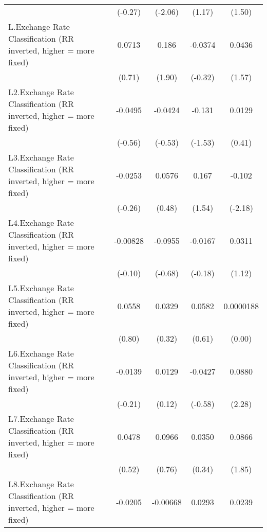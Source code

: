{\begin{longtable}{l*{4}{c}}
                &  (-0.27)         &  (-2.06)         &   (1.17)         &   (1.50)         \\
[1em]
L.Exchange Rate Classification (RR inverted, higher = more fixed)&   0.0713         &    0.186         &  -0.0374         &   0.0436         \\
                &   (0.71)         &   (1.90)         &  (-0.32)         &   (1.57)         \\
[1em]
L2.Exchange Rate Classification (RR inverted, higher = more fixed)&  -0.0495         &  -0.0424         &   -0.131         &   0.0129         \\
                &  (-0.56)         &  (-0.53)         &  (-1.53)         &   (0.41)         \\
[1em]
L3.Exchange Rate Classification (RR inverted, higher = more fixed)&  -0.0253         &   0.0576         &    0.167         &   -0.102\sym{*}  \\
                &  (-0.26)         &   (0.48)         &   (1.54)         &  (-2.18)         \\
[1em]
L4.Exchange Rate Classification (RR inverted, higher = more fixed)& -0.00828         &  -0.0955         &  -0.0167         &   0.0311         \\
                &  (-0.10)         &  (-0.68)         &  (-0.18)         &   (1.12)         \\
[1em]
L5.Exchange Rate Classification (RR inverted, higher = more fixed)&   0.0558         &   0.0329         &   0.0582         &0.0000188         \\
                &   (0.80)         &   (0.32)         &   (0.61)         &   (0.00)         \\
[1em]
L6.Exchange Rate Classification (RR inverted, higher = more fixed)&  -0.0139         &   0.0129         &  -0.0427         &   0.0880\sym{*}  \\
                &  (-0.21)         &   (0.12)         &  (-0.58)         &   (2.28)         \\
[1em]
L7.Exchange Rate Classification (RR inverted, higher = more fixed)&   0.0478         &   0.0966         &   0.0350         &   0.0866         \\
                &   (0.52)         &   (0.76)         &   (0.34)         &   (1.85)         \\
[1em]
L8.Exchange Rate Classification (RR inverted, higher = more fixed)&  -0.0205         & -0.00668         &   0.0293         &   0.0239         \\

\end{longtable}}

